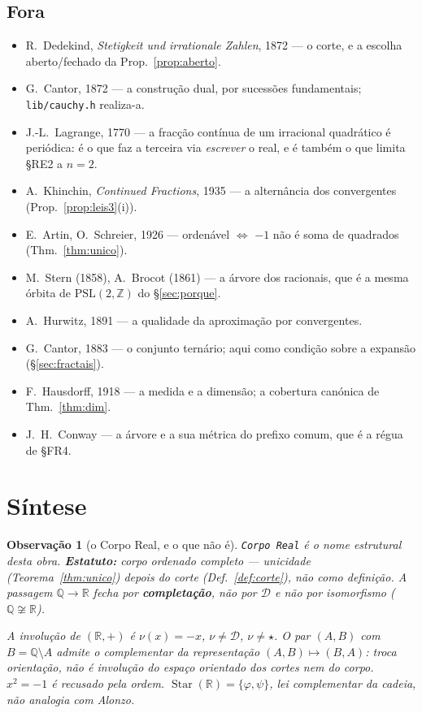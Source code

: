 \documentclass[11pt,a4paper]{article}
\newtheorem{observacao}{Observação}
\newcommand{\code}[1]{\texttt{\small #1}}
\begin{document}
\subsection*{Fora}

\begin{itemize}\itemsep2pt
\item R.~Dedekind, \emph{Stetigkeit und irrationale Zahlen}, 1872 --- o corte, e
a escolha aberto/fechado da Prop.~\ref{prop:aberto}.
\item G.~Cantor, 1872 --- a construção dual, por sucessões fundamentais;
\code{lib/cauchy.h} realiza-a.
\item J.-L.~Lagrange, 1770 --- a fracção contínua de um irracional quadrático é
periódica: é o que faz a terceira via \emph{escrever} o real, e é também o que
limita §RE2 a $n=2$.
\item A.~Khinchin, \emph{Continued Fractions}, 1935 --- a alternância dos
convergentes (Prop.~\ref{prop:leis3}(i)).
\item E.~Artin, O.~Schreier, 1926 --- ordenável $\iff$ $-1$ não é soma de
quadrados (Thm.~\ref{thm:unico}).
\item M.~Stern (1858), A.~Brocot (1861) --- a árvore dos racionais, que é a
mesma órbita de $\mathrm{PSL}(2,\mathbb{Z})$ do §\ref{sec:porque}.
\item A.~Hurwitz, 1891 --- a qualidade da aproximação por convergentes.
\item G.~Cantor, 1883 --- o conjunto ternário; aqui como condição sobre a
expansão (§\ref{sec:fractais}).
\item F.~Hausdorff, 1918 --- a medida e a dimensão; a cobertura canónica de
Thm.~\ref{thm:dim}.
\item J.~H.~Conway --- a árvore e a sua métrica do prefixo comum, que é a régua
de §FR4.
\end{itemize}

\section*{Síntese}

\begin{observacao}[o Corpo Real, e o que não é]
\texttt{Corpo Real} é o nome estrutural desta obra. \textbf{Estatuto:}
corpo ordenado completo --- unicidade (Teorema~\ref{thm:unico}) \emph{depois}
do corte (Def.~\ref{def:corte}), não como definição.
A passagem $\mathbb{Q}\to\mathbb{R}$ fecha por \textbf{completação}, não por
$\mathcal{D}$ e não por isomorfismo ($\mathbb{Q}\not\cong\mathbb{R}$).

A involução de $(\mathbb{R},+)$ é $\nu(x)=-x$, $\nu\neq\mathcal{D}$,
$\nu\neq\star$. O par $(A,B)$ com $B=\mathbb{Q}\setminus A$ admite o
complementar da representação $(A,B)\mapsto(B,A)$: troca orientação, não é
involução do espaço orientado dos cortes nem do corpo.
$x^{2}=-1$ é recusado pela ordem. $\operatorname{Star}(\mathbb{R})=\{\varphi,\psi\}$,
lei complementar da cadeia, não analogia com Alonzo.
\end{observacao}
\end{document}

